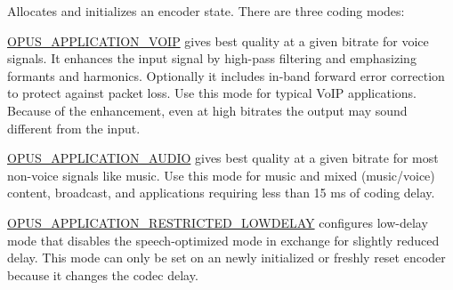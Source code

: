 Allocates and initializes an encoder state. There are three coding modes:

\hyperlink{group__opus__ctlvalues_ga07884aa018303a419d1f7acb2f3fa669}{OPUS\_\-APPLICATION\_\-VOIP} gives best quality at a given bitrate for voice signals. It enhances the input signal by high-\/pass filtering and emphasizing formants and harmonics. Optionally it includes in-\/band forward error correction to protect against packet loss. Use this mode for typical VoIP applications. Because of the enhancement, even at high bitrates the output may sound different from the input.

\hyperlink{group__opus__ctlvalues_ga5909f7cb35c04f1110026c6889edd345}{OPUS\_\-APPLICATION\_\-AUDIO} gives best quality at a given bitrate for most non-\/voice signals like music. Use this mode for music and mixed (music/voice) content, broadcast, and applications requiring less than 15 ms of coding delay.

\hyperlink{group__opus__ctlvalues_ga592232fb39db60c1369989c5c5d19a07}{OPUS\_\-APPLICATION\_\-RESTRICTED\_\-LOWDELAY} configures low-\/delay mode that disables the speech-\/optimized mode in exchange for slightly reduced delay. This mode can only be set on an newly initialized or freshly reset encoder because it changes the codec delay.


